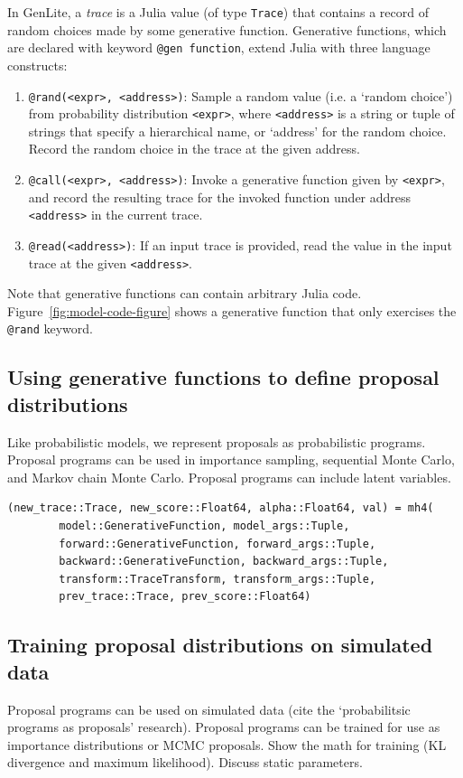 \documentclass{article}
\newcommand{\expr}[0]{\texttt{<expr>}}
\newcommand{\address}[0]{\texttt{<address>}}
\begin{document}
In GenLite, a \emph{trace} is a Julia value (of type \texttt{Trace}) that contains a record of random choices made by some generative function.
Generative functions, which are declared with keyword \texttt{@gen function}, extend Julia with three language constructs:
\begin{enumerate}
\item \texttt{@rand(<expr>, <address>)}: Sample a random value (i.e. a `random choice') from probability distribution \expr{}, where \address{} is a string or tuple of strings that specify a hierarchical name, or `address' for the random choice.
Record the random choice in the trace at the given address.
\item \texttt{@call(<expr>, <address>)}: Invoke a generative function given by \expr{}, and record the resulting trace for the invoked function under address \address{} in the current trace.
\item \texttt{@read(<address>)}: If an input trace is provided, read the value in the input trace at the given \address{}.
\end{enumerate}

Note that generative functions can contain arbitrary Julia code.
Figure~\ref{fig:model-code-figure} shows a generative function that only exercises the \texttt{@rand} keyword.

\subsection{Using generative functions to define proposal distributions}
Like probabilistic models, we represent proposals as probabilistic programs.
Proposal programs can be used in importance sampling, sequential Monte Carlo, and Markov chain Monte Carlo.
Proposal programs can include latent variables.

\begin{lstlisting}[basicstyle=\ttfamily\small]
(new_trace::Trace, new_score::Float64, alpha::Float64, val) = mh4(
        model::GenerativeFunction, model_args::Tuple,
        forward::GenerativeFunction, forward_args::Tuple,
        backward::GenerativeFunction, backward_args::Tuple,
        transform::TraceTransform, transform_args::Tuple,
        prev_trace::Trace, prev_score::Float64)
\end{lstlisting}


\subsection{Training proposal distributions on simulated data}
Proposal programs can be used on simulated data (cite the `probabilitsic programs as proposals' research).
Proposal programs can be trained for use as importance distributions or MCMC proposals.
Show the math for training (KL divergence and maximum likelihood).
Discuss static parameters.
\end{document}

